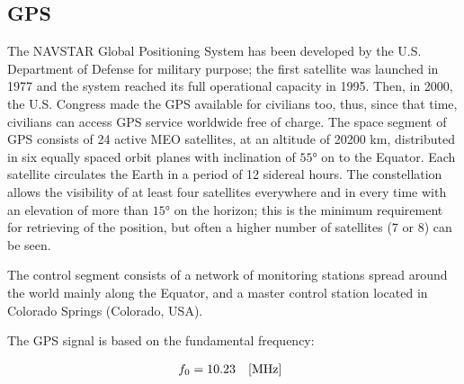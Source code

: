 \subsection{GPS}

The NAVSTAR Global Positioning System has been developed by the U.S. Department of Defense for military purpose; the first satellite was launched in 1977 and the system reached its full operational capacity in 1995. Then, in 2000, the U.S. Congress made the GPS available for civilians too, thus, since that time, civilians can access GPS service worldwide free of charge.
The space segment of GPS consists of 24 active MEO satellites, at an altitude of 20200 km, distributed in six equally spaced orbit planes with inclination of $\ang{55}$ on to the Equator. Each satellite circulates the Earth in a period of 12 sidereal hours. The constellation allows the visibility of at least four satellites everywhere and in every time with an elevation of more than $\ang{15}$ on the horizon; this is the minimum requirement for retrieving of the position, but often a higher number of satellites (7 or 8) can be seen. 


%
%

The control segment consists of a network of monitoring stations spread around the world mainly along the Equator, and a master control station located in Colorado Springs (Colorado, USA).

The GPS signal is based on the fundamental frequency:

\begin{equation}
	\begin{matrix}
		f_{0} = 10.23 & [\unit{MHz}]
	\end{matrix}\\
	\label{eq:f0GPS}
\end{equation}

